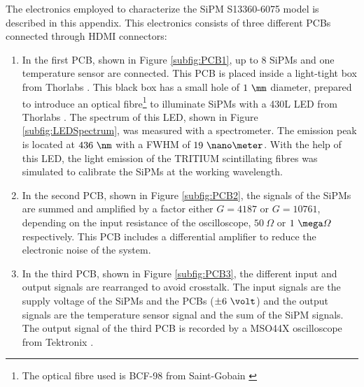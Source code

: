 The electronics employed to characterize the SiPM S13360-6075 model is described in this appendix. This electronics consists of three different PCBs connected through HDMI connectors:

\begin{enumerate}
\item{} In the first PCB, shown in Figure \ref{subfig:PCB1}, up to 8 SiPMs and one temperature sensor are connected. This PCB is placed inside a light-tight box from Thorlabs \cite{ThorlabsCompany}. This black box has a small hole of $1~\mm$ diameter, prepared to introduce an optical fibre\footnote{The optical fibre used is BCF-98 from Saint-Gobain \cite{OpticalFibers}} to illuminate SiPMs with a 430L LED from Thorlabs \cite{LEDThorlabs}. The spectrum of this LED, shown in Figure \ref{subfig:LEDSpectrum}, was measured with a spectrometer. The emission peak is located at $436~\nm$ with a FWHM of $19~\nano\meter$. With the help of this LED, the light emission of the TRITIUM scintillating fibres was simulated to calibrate the SiPMs at the working wavelength. 

\item{} In the second PCB, shown in Figure \ref{subfig:PCB2}, the signals of the SiPMs are summed and amplified by a factor either $G=4187$ or $G=10761$, depending on the input resistance of the oscilloscope, $50~\varOmega$ or $1~\mega\varOmega$ respectively. This PCB includes a differential amplifier to reduce the electronic noise of the system.

\item{} In the third PCB, shown in Figure \ref{subfig:PCB3}, the different input and output signals are rearranged to avoid crosstalk. The input signals are the supply voltage of the SiPMs and the PCBs ($\pm 6~\volt$) and the output signals are the temperature sensor signal and the sum of the SiPM signals. The output signal of the third PCB is recorded by a MSO44X oscilloscope from Tektronix \cite{Oscilloscope}.

\end{enumerate}

